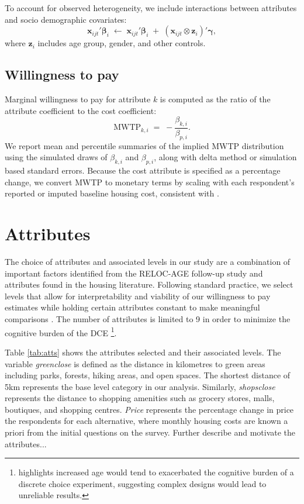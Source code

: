 \documentclass[3p,11pt ]{elsarticle}
\begin{document}
To account for observed heterogeneity, we include interactions between attributes and socio demographic covariates:
\begin{equation}
\mathbf{x}_{ijt}' \boldsymbol{\beta}_i \; \leftarrow \; \mathbf{x}_{ijt}' \boldsymbol{\beta}_i \;+\; \left( \mathbf{x}_{ijt} \otimes \mathbf{z}_i \right)'\boldsymbol{\gamma},
\end{equation}
where $\mathbf{z}_i$ includes age group, gender, and other controls.

\subsection{Willingness to pay}
Marginal willingness to pay for attribute $k$ is computed as the ratio of the attribute coefficient to the cost coefficient:
\begin{equation}
\text{MWTP}_{k,i} \;=\; - \frac{\beta_{k,i}}{\beta_{p,i}}.
\end{equation}
We report mean and percentile summaries of the implied MWTP distribution using the simulated draws of $\beta_{k,i}$ and $\beta_{p,i}$, along with delta method or simulation based standard errors. Because the cost attribute is specified as a percentage change, we convert MWTP to monetary terms by scaling with each respondent's reported or imputed baseline housing cost, consistent with \citet{Caplan2021}.


\section{Attributes}

The choice of attributes and associated levels in our study are a combination of important factors identified from the RELOC-AGE follow-up study and attributes found in the housing literature.
Following standard practice,
we select levels that allow for interpretability and viability of our willingness to pay estimates while holding certain attributes constant to make meaningful comparisons \citep{hensherAppliedChoiceAnalysis2015}.
The number of attributes is limited to 9 in order to minimize the cognitive burden of the DCE \citep{manghamHowNotDesigning2009,deshazoDesigningChoiceSets2002}
\footnote{\cite{himmlerWhatWorksBetter2021} highlights increased age would tend to exacerbated the cognitive burden of a discrete choice experiment, suggesting complex designs would lead to unreliable results.}.


Table \ref{tab:atts} shows the attributes selected and their associated levels.
The variable \textit{greenclose} is defined as the distance in kilometres to green areas including parks, forests, hiking areas, and open spaces.
The shortest distance of 5km represents the base level category in our analysis.
Similarly,
\textit{shopsclose} represents the distance to shopping amenities such as grocery stores, malls, boutiques, and shopping centres.
\textit{Price} represents the percentage change in price the respondents for each alternative,
where monthly housing costs are known a priori from the initial questions on the survey.
Further describe and motivate the attributes...
\end{document}
